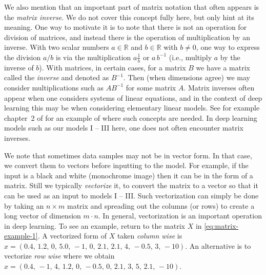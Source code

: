 \documentclass[12pt]{article}
\begin{document}
We also mention that an important part of matrix notation that often appears is the {\em matrix inverse}. We do not cover this concept fully here, but only hint at its meaning. One way to motivate it is to note that there is not an operation for division of matrices, and instead there is the operation of multiplication by an inverse. With two scalar numbers $a \in {\mathbb R}$ and $b \in {\mathbb R}$ with $b \neq 0$, one way to express the division $a/b$ is via the multiplication $a \frac{1}{b}$ or $a \,b^{-1}$ (i.e., multiply $a$ by the inverse of $b$). With matrices, in certain cases, for a matrix $B$ we have a matrix called the {\em inverse} and denoted as $B^{-1}$. Then (when dimensions agree) we may consider multiplications such as $A B^{-1}$ for some matrix $A$. Matrix inverses often appear when one considers systems of linear equations, and in the context of deep learning this may be when considering elementary linear models. See for example chapter~2 of  \cite{LiquetMokaNazarathy2024DeepLearning} for an example of where such concepts are needed. In deep learning models such as our models I -- III here, one does not often encounter matrix inverses.

We note that sometimes data samples may not be in vector form. In that case, we convert them to vectors before inputting to the model. For example, if the input is a black and white (monochrome image) then it can be in the form of a matrix. Still we typically {\em vectorize} it, to convert the matrix to a vector so that it can be used as an input to models I -- III. Such vectorization can simply be done by taking an $n \times m$ matrix and spreading out the columns (or rows) to create a long vector of dimension $m \cdot n$. In general, vectorization is an important operation in deep learning. To see an example, return to the matrix $X$ in \eqref{eq:matrix-example-1}. A vectorized form of $X$ taken {\em column wise} is $x = (0.4,\, 1.2,\, 0,\, 5.0,\, -1,\, 0,\, 2.1,\, 2.1,\, 4,\, -0.5,\, 3,\, -10)$. An alternative is to vectorize {\em row wise} where we obtain $x = (0.4,\, -1,\, 4,\, 1.2,\, 0,\, -0.5,\, 0,\, 2.1,\, 3,\, 5,\, 2.1,\, -10)$.
\end{document}
